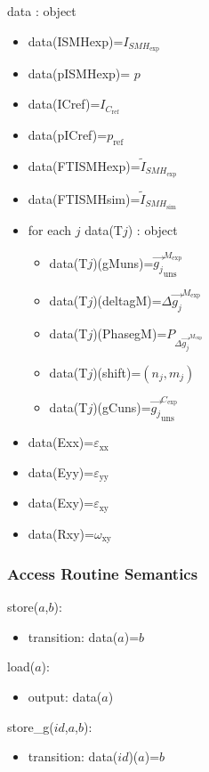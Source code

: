 \documentclass[12pt, titlepage]{article}
\begin{document}
data : object
\begin{itemize}
\item data(ISMHexp)=$I_{\mathit{SMH}_{\text{exp}}}$
\item data(pISMHexp)= $p$
\item data(ICref)=$I_{\mathit{C}_{\text{ref}}}$
\item data(pICref)=$p_{\text{ref}}$
\item data(FTISMHexp)=$\widetilde{I}_{\mathit{SMH}_{\text{exp}}}$
\item data(FTISMHsim)=$\widetilde{I}_{\mathit{SMH}_{\text{sim}}}$
\item for each $j$ data(T$j$) : object 
	\begin{itemize}
	\item data(T$j$)(gMuns)=$\overrightarrow{g_{j}}_{\text{uns}}^{M_{\text{exp}}}$
	\item data(T$j$)(deltagM)=$\Delta \overrightarrow{g_{j}}^{M_{\text{exp}}}$
	\item data(T$j$)(PhasegM)=$P_{\Delta \overrightarrow{g_{j}}^{M_{\text{exp}}}}$
	\item data(T$j$)(shift)=$(n_j,m_j)$
	\item data(T$j$)(gCuns)=$\overrightarrow{g_{j}}_{\text{uns}}^{C_{\text{exp}}}$
	\end{itemize}
\item data(Exx)=$\varepsilon_{\text{xx}}$
\item data(Eyy)=$\varepsilon_{\text{yy}}$
\item data(Exy)=$\varepsilon_{\text{xy}}$
\item data(Rxy)=$\omega_{\text{xy}}$
\end{itemize}

\subsubsection{Access Routine Semantics}

\noindent store($a$,$b$):
\begin{itemize}
\item transition: data($a$)=$b$
\end{itemize}

\noindent load($a$):
\begin{itemize}
\item output: data($a$)
\end{itemize}

\noindent store{\_}g($id$,$a$,$b$):
\begin{itemize}
\item transition: data($id$)($a$)=$b$
\end{itemize}
\end{document}
